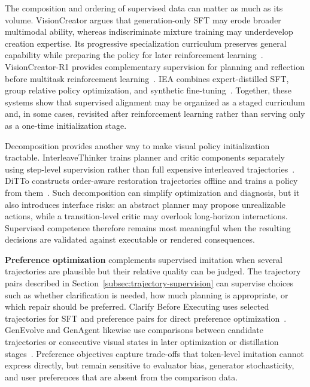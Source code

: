 The composition and ordering of supervised data can matter as much as its volume. VisionCreator argues that generation-only SFT may erode broader multimodal ability, whereas indiscriminate mixture training may underdevelop creation expertise. Its progressive specialization curriculum preserves general capability while preparing the policy for later reinforcement learning~\cite{avg260302681}. VisionCreator-R1 provides complementary supervision for planning and reflection before multitask reinforcement learning~\cite{avg260308812}. IEA combines expert-distilled SFT, group relative policy optimization, and synthetic fine-tuning~\cite{avg260608016}. Together, these systems show that supervised alignment may be organized as a staged curriculum and, in some cases, revisited after reinforcement learning rather than serving only as a one-time initialization stage.

Decomposition provides another way to make visual policy initialization tractable. InterleaveThinker trains planner and critic components separately using step-level supervision rather than full expensive interleaved trajectories~\cite{avg260613679}. DiTTo constructs order-aware restoration trajectories offline and trains a policy from them~\cite{avg260530915}. Such decomposition can simplify optimization and diagnosis, but it also introduces interface risks: an abstract planner may propose unrealizable actions, while a transition-level critic may overlook long-horizon interactions. Supervised competence therefore remains most meaningful when the resulting decisions are validated against executable or rendered consequences.

\textbf{Preference optimization} complements supervised imitation when several trajectories are plausible but their relative quality can be judged. The trajectory pairs described in Section~\ref{subsec:trajectory-supervision} can supervise choices such as whether clarification is needed, how much planning is appropriate, or which repair should be preferred. Clarify Before Executing uses selected trajectories for SFT and preference pairs for direct preference optimization~\cite{avg260716352}. GenEvolve and GenAgent likewise use comparisons between candidate trajectories or consecutive visual states in later optimization or distillation stages~\cite{chen2026genevolve,jiang2026genagent}. Preference objectives capture trade-offs that token-level imitation cannot express directly, but remain sensitive to evaluator bias, generator stochasticity, and user preferences that are absent from the comparison data.

